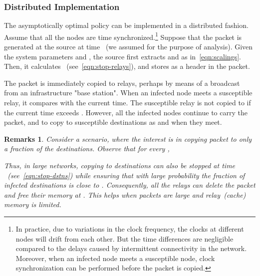 \documentclass[10pt,journal,letterpaper]{IEEEtran}
\newtheorem{remarks}{Remarks}[section]
\newcommand{\remove}[1]{}
\begin{document}
\subsubsection*{Distributed Implementation}
The asymptotically optimal policy can be implemented
in a distributed fashion. Assume that all the nodes are time
synchronized.\footnote{In practice, due to variations in the clock
frequency, the clocks at different nodes will drift from each other.
But the time differences are negligible compared to the delays
caused by intermittent connectivity in the network. Moreover, when
an infected node meets a susceptible node, clock synchronization can
be performed before the packet is copied.} Suppose that the packet
is generated at the source at time ~(we assumed  for
the purpose of analysis). Given the system parameters
 and , the source first extracts
 and  as
in~\eqref{eqn:scalings}. Then, it calculates
~(see~\eqref{eqn:stop-relays}), and stores   as a header in the packet. \remove{
\begin{enumerate}
\item the time at which copying to relays is stopped - this is set to .
\item the time at which copying to destinations is stopped - this is set to .
\end{enumerate}}

The packet is immediately copied to  relays, perhaps by means of a
broadcast from an infrastructure "base station". When an infected
node meets a susceptible relay, it compares  with
the current time. The susceptible relay is not copied to if the
current time exceeds . However, all the infected
nodes continue to carry the packet, and to copy to susceptible
destinations as and when they meet.

\begin{remarks}
Consider a scenario, where the interest is in copying packet to only
a  fraction  of the destinations. Observe that for
every ,

Thus, in large networks, copying to destinations can also be stopped at
time ~(see~\eqref{eqn:stop-dstns}) while ensuring that
with large probability the fraction of infected destinations is
close to . Consequently, all the relays can delete the
packet and free their memory at .
This helps when packets are large and relay~(cache) memory is limited.
\end{remarks}
\end{document}
